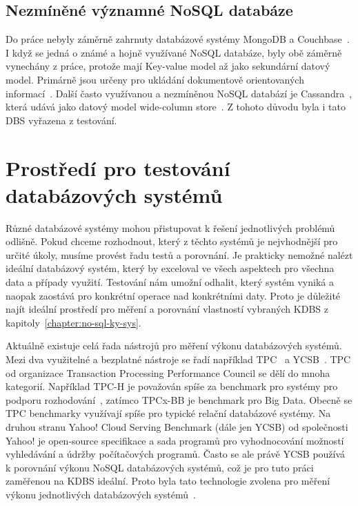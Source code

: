 \documentclass[czech,master,dept460,male,csharp,cpdeclaration]{diploma}
\begin{document}
	\section {Nezmíněné významné NoSQL databáze}
	
		Do práce nebyly záměrně zahrnuty databázové systémy MongoDB a Couchbase~\cite{mongodb,couchbase}. I když se jedná o známé a hojně využívané NoSQL databáze, byly obě záměrně vynechány z práce, protože mají Key-value model až jako sekundární datový model. Primárně jsou určeny pro ukládání dokumentově orientovaných informací~\cite{documentdb}. Další často využívanou a nezmíněnou NoSQL databází je Cassandra~\cite{cassandra}, která udává jako datový model wide-column store~\cite{widecolumnstore}. Z tohoto důvodu byla i tato DBS vyřazena z testování.
	
	\chapter{Prostředí pro testování databázových systémů\label{chapter:3-test_environment}}
	
	Různé databázové systémy mohou přistupovat k řešení jednotlivých problémů odlišně. Pokud chceme rozhodnout, který z těchto systémů je nejvhodnější pro určité úkoly, musíme provést řadu testů a porovnání. Je prakticky nemožné nalézt ideální databázový systém, který by exceloval ve všech aspektech pro všechna data a případy využití. Testování nám umožní odhalit, který systém vyniká a naopak zaostává pro konkrétní operace nad konkrétními daty. Proto je důležité najít ideální prostředí pro měření a porovnání vlastností vybraných KDBS z kapitoly~\ref{chapter:no-sql-ky-sys}.
	
	Aktuálně existuje celá řada nástrojů pro měření výkonu databázových systémů. Mezi dva využitelné a bezplatné nástroje se řadí například TPC~\cite{tpc} a YCSB~\cite{ycsb}. TPC od organizace Transaction Processing Performance Council se dělí do mnoha kategorií. Například TPC-H je považován spíše za benchmark pro systémy pro podporu rozhodování~\cite{dss}, zatímco TPCx-BB je benchmark pro Big Data. Obecně se TPC benchmarky využívají spíše pro typické relační databázové systémy. Na druhou stranu Yahoo! Cloud Serving Benchmark (dále jen YCSB) od společnosti Yahoo! je open-source specifikace a sada programů pro vyhodnocování možností vyhledávání a údržby počítačových programů. Často se ale právě YCSB používá k porovnání výkonu NoSQL databázových systémů, což je pro tuto práci zaměřenou na KDBS ideální. Proto byla tato technologie zvolena pro měření výkonu jednotlivých databázových systémů~\cite{benchmark-pdf-1, benchmark-pdf-2}.
	
\end{document}

